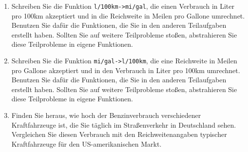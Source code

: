 \begin{aufgabe}
\begin{enumerate}
  \item Schreiben Sie die Funktion
    \texttt{l/100km->mi/gal}, die einen Verbrauch in Liter pro 100km
    akzeptiert und in die Reichweite in Meilen pro Gallone umrechnet.
    Benutzen Sie dafür die Funktionen, die Sie in den anderen
    Teilaufgaben erstellt haben.  Sollten Sie auf weitere Teilprobleme
    stoßen, abstrahieren Sie diese Teilprobleme in eigene Funktionen.

  \item Schreiben Sie die Funktion
    \texttt{mi/gal->l/100km}, die eine Reichweite in Meilen pro
    Gallone akzeptiert und in den Verbrauch in Liter pro 100km
    umrechnet.  Benutzen Sie dafür die Funktionen, die Sie in den
    anderen Teilaufgaben erstellt haben.  Sollten Sie auf weitere
    Teilprobleme stoßen, abstrahieren Sie diese Teilprobleme in eigene
    Funktionen.

  \item Finden Sie heraus, wie hoch der Benzinverbrauch
    verschiedener Kraftfahrzeuge ist, die Sie täglich im
    Straßenverkehr in Deutschland sehen.  Vergleichen Sie diesen
    Verbrauch mit den Reichweitenangaben typischer Kraftfahrzeuge für
    den US-amerikanischen Markt.
  \end{enumerate}

\end{aufgabe}





